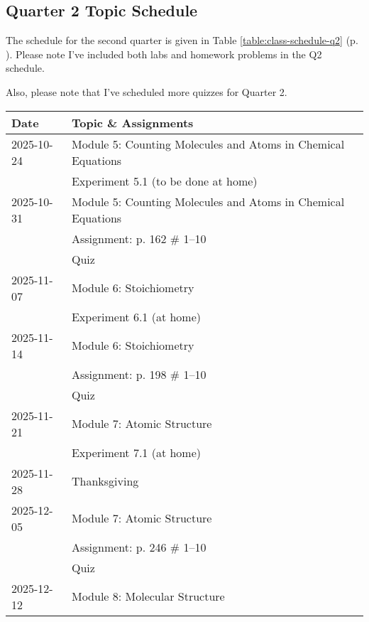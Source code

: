\documentclass[11pt, oneside]{article}   	%
\begin{document}
\subsection*{Quarter 2 Topic Schedule}
The schedule for the second quarter is given in Table \ref{table:class-schedule-q2} (p. \pageref{table:class-schedule-q2}).
Please note I've included both labs and homework problems in the Q2 schedule.

Also, please note that I've scheduled more quizzes for Quarter 2.


\begin{table}[h]
\centering
\begin{tabular}{ l | l }
Date & Topic \& Assignments \\
\hline
2025-10-24 & Module 5:  Counting Molecules and Atoms in Chemical Equations \\
                   & Experiment 5.1 (to be done at home) \\

\hline
2025-10-31 & Module 5:  Counting Molecules and Atoms in Chemical Equations \\
                   & Assignment: p. 162 \# 1--10 \\
                   & Quiz \\
                   
\hline
2025-11-07 & Module 6: Stoichiometry \\
                   & Experiment 6.1 (at home) \\

\hline
2025-11-14 & Module 6: Stoichiometry \\
                   & Assignment: p. 198 \# 1--10 \\
                   & Quiz \\

\hline
2025-11-21 & Module 7: Atomic Structure \\
                   & Experiment 7.1 (at home) \\

\hline
2025-11-28 & Thanksgiving \\

\hline
2025-12-05 & Module 7: Atomic Structure \\
                   & Assignment: p. 246 \# 1--10 \\
                   & Quiz \\

\hline
2025-12-12 & Module 8: Molecular Structure \\


\end{tabular}
\end{table}
\end{document}
